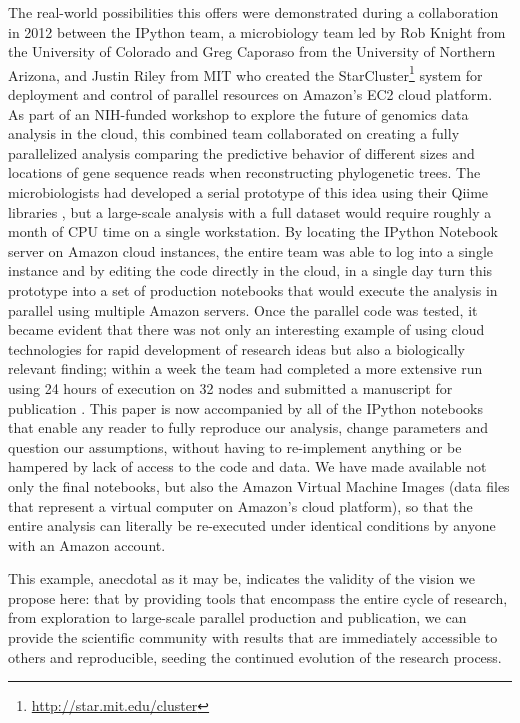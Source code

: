 \documentclass[11pt,oneside,english]{article}
\begin{document}
The real-world possibilities this offers were demonstrated during a
collaboration in 2012 between the IPython team, a microbiology team led by Rob
Knight from the University of Colorado and Greg Caporaso from the University of
Northern Arizona, and Justin Riley from MIT who created the
StarCluster\footnote{\url{http://star.mit.edu/cluster}} system for deployment
and control of parallel resources on Amazon's EC2 cloud platform.  As part of
an NIH-funded workshop to explore the future of genomics data analysis in the
cloud, this combined team collaborated on creating a fully parallelized
analysis comparing the predictive behavior of different sizes and locations of
gene sequence reads when reconstructing phylogenetic trees.  The
microbiologists had developed a serial prototype of this idea using their Qiime
libraries \cite{caporaso2010qiime}, but a large-scale analysis with a full
dataset would require roughly a month of CPU time on a single workstation.  By
locating the IPython Notebook server on Amazon cloud instances, the entire team
was able to log into a single instance and by editing the code directly in the
cloud, in a single day turn this prototype into a set of production notebooks
that would execute the analysis in parallel using multiple Amazon servers.
Once the parallel code was tested, it became evident that there was not only an
interesting example of using cloud technologies for rapid development of
research ideas but also a biologically relevant finding; within a week the team
had completed a more extensive run using 24 hours of execution on 32 nodes and
submitted a manuscript for publication \cite{RWM+12}.  This paper is now
accompanied by all of the IPython notebooks that enable any reader to fully
reproduce our analysis, change parameters and question our assumptions, without
having to re-implement anything or be hampered by lack of access to the code
and data.  We have made available not only the final notebooks, but also the
Amazon Virtual Machine Images (data files that represent a virtual computer on
Amazon's cloud platform), so that the entire analysis can literally be
re-executed under identical conditions by anyone with an Amazon account.

This example, anecdotal as it may be, indicates the validity of the vision
we propose here: that by providing tools that encompass the entire cycle of
research, from exploration to large-scale parallel production and publication,
we can provide the scientific community with results that are immediately
accessible to others and reproducible, seeding the continued evolution of the
research process.
\end{document}
